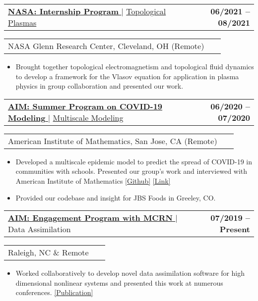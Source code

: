 \documentclass[letterpaper,11pt]{article}
\makeatletter
\newcommand{\accentcolor}[1]{\textcolor{accentcolor}{#1}}
\newcommand{\resumeItem}[1]{
  \item\small{
    {#1 \vspace{-2pt}}
  }
}
\newcommand{\resumeProjectHeading}[2]{
    \item
    \begin{tabular*}{1.001\textwidth}{l@{\extracolsep{\fill}}r}
      \small#1 & \textbf{\small #2}\\
    \end{tabular*}\vspace{-7pt}
}
\newcommand{\resumeItemListStart}{\begin{itemize}}
\newcommand{\resumeItemListEnd}{\end{itemize}\vspace{-5pt}}
\makeatother
\begin{document}
       \resumeProjectHeading
          {\href{https://intern.nasa.gov/}{\textbf{\large{NASA: Internship Program} \small{\raisebox{-0.1\height}\faExternalLink}}} $|$ \href{https://www.mathjobs.org/jobs/list/17245?rss}{\large{Topological Plasmas}}}{06/2021 -- 08/2021}
        \resumeProjectHeading{NASA Glenn Research Center, Cleveland, OH (Remote)}{~}
          \resumeItemListStart
            \resumeItem{\normalsize{Brought together topological electromagnetism and topological fluid dynamics to develop a framework for the Vlasov equation for application in plasma physics in group collaboration and presented our work.}}
          \resumeItemListEnd
      \resumeProjectHeading{\href{https://aimath.org/workshops/upcoming/mcrn2020/}{\textbf{\large{AIM: Summer Program on COVID-19 Modeling} \small{\raisebox{-0.1\height}\faExternalLink}}} $|$ \href{https://mathcommunities.org/taking-aim-at-covid-19/}{\large{Multiscale Modeling}}}{06/2020 -- 07/2020}
        \resumeProjectHeading{American Institute of Mathematics, San Jose, CA (Remote)}{~}
          \resumeItemListStart
            \resumeItem{\normalsize{Developed a multiscale epidemic model to predict the spread of COVID-19 in communities with schools. Presented our group's work and interviewed with American Institute of Mathematics \href{https://github.com/clairevalva/mcrn_multi_DA}{\accentcolor{[Github]}}} \href{https://mathcommunities.org/taking-aim-at-covid-19/}{\accentcolor{[Link]}}}
			\resumeItem{\normalsize{Provided our codebase and insight for JBS Foods in Greeley, CO.}}
          \resumeItemListEnd

          \resumeProjectHeading
          {\href{https://aimath.org/workshops/upcoming/mcrn2019/}{\textbf{\large{AIM: Engagement Program with MCRN}} \href{https://www.sciencedirect.com/science/article/abs/pii/S0898122121002121}{\raisebox{-0.1\height}\faExternalLink }} $|$ \large{Data Assimilation}}{07/2019 -- Present}
        \resumeProjectHeading{Raleigh, NC \& Remote}{~}
          \resumeItemListStart
            \resumeItem{\normalsize{Worked collaboratively to develop novel data assimilation software for high dimensional nonlinear systems and presented this work at numerous conferences. \href{https://www.sciencedirect.com/science/article/abs/pii/S0898122121002121}{\accentcolor{[Publication]}}}}
          \resumeItemListEnd
\end{document}
